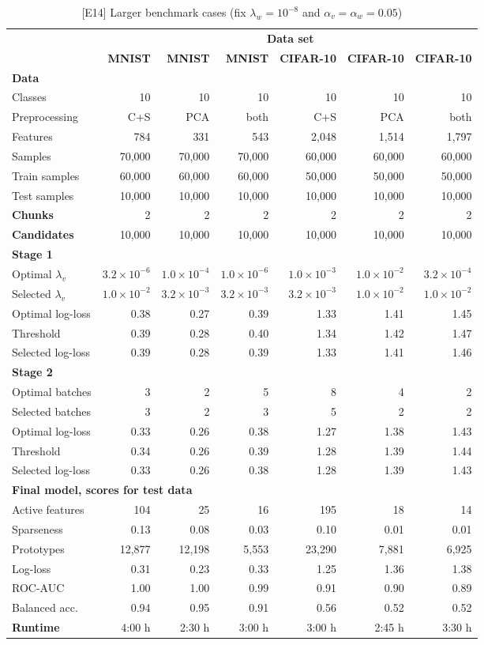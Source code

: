 %
\begin{table}
\caption{[E14] Larger benchmark cases (fix $\lambda_w=10^{-8}$ and $\alpha_v=\alpha_w=0.05$)}
\label{tab_e14}
%
\begin{center}
\small
\begin{tabular}{|lrrrrrr|}
\hline
&\multicolumn{6}{c|}{\textbf{\hrulefill\ Data set \hrulefill}}\\
&\textbf{MNIST}&\textbf{MNIST}&\textbf{MNIST}&\textbf{CIFAR-10}&\textbf{CIFAR-10}&\textbf{CIFAR-10}\\
\multicolumn{7}{|l|}{\textbf{Data}}\\
Classes&10&10&10&10&10&10\\
Preprocessing&C+S&PCA&both&C+S&PCA&both\\
Features&784&331&543&2,048&1,514&1,797\\
Samples&70,000&70,000&70,000&60,000&60,000&60,000\\
Train samples&60,000&60,000&60,000&50,000&50,000&50,000\\
Test samples&10,000&10,000&10,000&10,000&10,000&10,000\\
\textbf{Chunks}&2&2&2&2&2&2\\
\textbf{Candidates}&10,000&10,000&10,000&10,000&10,000&10,000\\
\multicolumn{7}{|l|}{\textbf{Stage 1}}\\
Optimal $\lambda_v$&$3.2\times10^{-6}$&$1.0\times10^{-4}$&$1.0\times10^{-6}$&$1.0\times10^{-3}$&$1.0\times10^{-2}$&$3.2\times10^{-4}$\\
Selected $\lambda_v$&$1.0\times10^{-2}$&$3.2\times10^{-3}$&$3.2\times10^{-3}$&$3.2\times10^{-3}$&$1.0\times10^{-2}$&$1.0\times10^{-2}$\\
Optimal log-loss&0.38&0.27&0.39&1.33&1.41&1.45\\
Threshold&0.39&0.28&0.40&1.34&1.42&1.47\\
Selected log-loss&0.39&0.28&0.39&1.33&1.41&1.46\\
\multicolumn{7}{|l|}{\textbf{Stage 2}}\\
Optimal batches&3&2&5&8&4&2\\
Selected batches&3&2&3&5&2&2\\
Optimal log-loss&0.33&0.26&0.38&1.27&1.38&1.43\\
Threshold&0.34&0.26&0.39&1.28&1.39&1.44\\
Selected log-loss&0.33&0.26&0.38&1.28&1.39&1.43\\
\multicolumn{7}{|l|}{\textbf{Final model, scores for test data}}\\
Active features&104&25&16&195&18&14\\
Sparseness&0.13&0.08&0.03&0.10&0.01&0.01\\
Prototypes&12,877&12,198&5,553&23,290&7,881&6,925\\
Log-loss&0.31&0.23&0.33&1.25&1.36&1.38\\
ROC-AUC&1.00&1.00&0.99&0.91&0.90&0.89\\
Balanced acc.&0.94&0.95&0.91&0.56&0.52&0.52\\
\textbf{Runtime}&4:00 h&2:30 h&3:00 h&3:00 h&2:45 h&3:30 h\\
\hline
\end{tabular}
\end{center}
\end{table}
